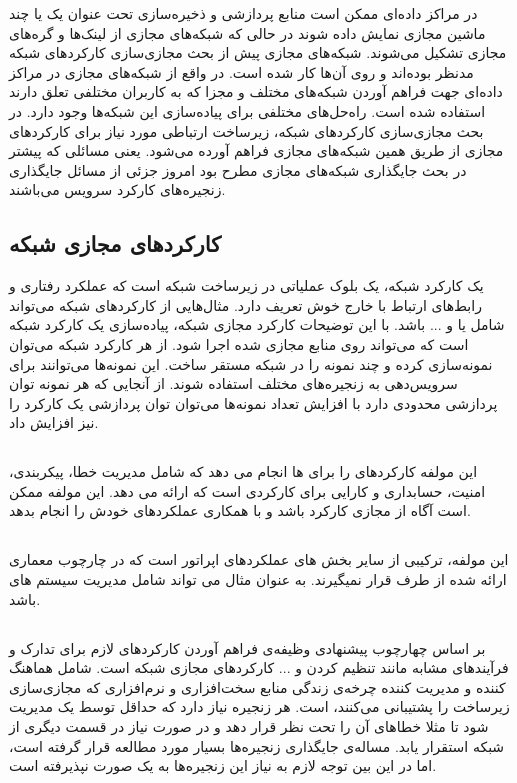 در مراکز داده‌ای ممکن است منابع پردازشی و ذخیره‌سازی تحت عنوان یک یا چند
ماشین مجازی نمایش داده شوند در حالی که شبکه‌های مجازی از لینک‌ها و گره‌های مجازی تشکیل می‌شوند.
شبکه‌های مجازی پیش از بحث مجازی‌سازی کارکردهای شبکه مدنظر بوده‌اند و روی آن‌ها کار شده است.
در واقع از شبکه‌های مجازی در مراکز داده‌ای جهت فراهم آوردن شبکه‌های مختلف و مجزا که به کاربران مختلفی تعلق دارند
استفاده شده است. راه‌حل‌های مختلفی برای پیاده‌سازی این شبکه‌ها وجود دارد. در بحث مجازی‌سازی کارکردهای شبکه‌، زیرساخت ارتباطی
مورد نیاز 
برای کارکردهای مجازی از طریق همین شبکه‌های مجازی فراهم آورده می‌شود.
یعنی مسائلی که پیشتر در بحث جایگذاری شبکه‌های مجازی مطرح بود
امروز جزئی از مسائل جایگذاری زنجیره‌های کارکرد سرویس می‌باشند.

\subsection{کارکردهای مجازی شبکه}
یک کارکرد شبکه، یک بلوک عملیاتی در زیرساخت شبکه است که عملکرد رفتاری و رابط‌های ارتباط با خارج خوش تعریف دارد.
مثال‌هایی از کارکردهای شبکه می‌تواند شامل
یا
و ... باشد.
با این توضیحات کارکرد مجازی شبکه، پیاده‌سازی یک کارکرد شبکه است
که می‌تواند روی منابع مجازی شده اجرا شود.
از هر کارکرد شبکه می‌توان نمونه‌سازی کرده و چند نمونه را در شبکه مستقر ساخت. 
این نمونه‌ها می‌توانند برای سرویس‌دهی به زنجیره‌های مختلف استفاده شوند. از آنجایی که 
هر نمونه توان پردازشی محدودی دارد با افزایش تعداد نمونه‌ها می‌توان توان پردازشی یک کارکرد را نیز افزایش داد.

\subsection{}
این مولفه کارکردهای  را برای  ها انجام می دهد که شامل مدیریت خطا، پیکربندی، امنیت، حسابداری و کارایی برای کارکردی است که  ارائه می دهد. این مولفه ممکن است آگاه از مجازی کارکرد باشد و با همکاری  عملکردهای خودش را انجام بدهد.

\subsection{}
این مولفه، ترکیبی از سایر بخش های عملکردهای اپراتور است که در چارچوب معماری  ارائه شده از طرف  قرار نمیگیرند. به عنوان مثال می تواند شامل مدیریت سیستم های  باشد.

\subsection{}
بر اساس چهارچوب پیشنهادی 
وظیفه‌ی  فراهم آوردن کارکردهای لازم
برای تدارک و فرآیند‌های مشابه مانند تنظیم کردن و ... کارکردهای مجازی شبکه است.
 شامل هماهنگ کننده و مدیریت کننده چرخه‌ی زندگی
منابع سخت‌افزاری و نرم‌افزاری که مجازی‌سازی زیرساخت را پشتیبانی می‌کنند، است.
هر زنجیره نیاز دارد که حداقل توسط یک  مدیریت شود
تا مثلا خطاهای آن را تحت نظر قرار دهد و در صورت نیاز در قسمت دیگری از شبکه استقرار یابد.
مساله‌ی جایگذاری زنجیره‌ها بسیار مورد مطالعه قرار گرفته است، اما در این بین توجه لازم به نیاز این زنجیره‌ها به یک
صورت نپذیرفته است.
